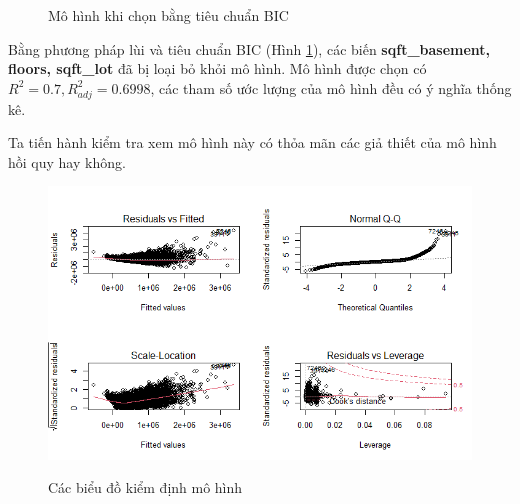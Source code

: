\begin{figure}[h!]
	\centering
	\hfill
	\caption{Mô hình khi chọn bằng tiêu chuẩn BIC}
	\label{B2_BIC}
\end{figure}
 Bằng phương pháp lùi và tiêu chuẩn BIC (Hình \ref{B2_BIC}), các biến \textbf{sqft\_basement, floors, sqft\_lot} đã bị loại bỏ khỏi mô hình. Mô hình được chọn có $R^2=0.7,R^2_{adj}=0.6998$, các tham số ước lượng của mô hình đều có ý nghĩa thống kê.
 
 Ta tiến hành kiểm tra xem mô hình này có thỏa mãn các giả thiết của mô hình hồi quy hay không.
 
 \begin{figure}[h!]
 	\centering
 	{\includegraphics[width=.85\linewidth]{../Photo Of Result/B2_originalmodel}}
 	\caption{Các biểu đồ kiểm định mô hình}
 	\label{B2_check}
 \end{figure}
 
